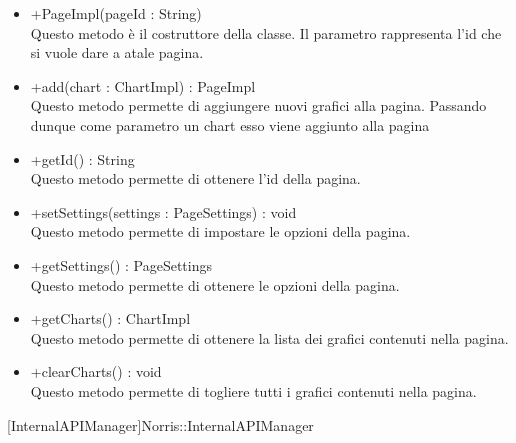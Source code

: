 \begin{itemize}
\begin{itemize}
					\item[\ding{111}] {{+PageImpl(pageId : String)}} \\ [1mm] Questo metodo è il costruttore della classe. Il parametro rappresenta l'id che si vuole dare a atale pagina.
					\item[\ding{111}] {{+add(chart : ChartImpl) : PageImpl}} \\ [1mm] Questo metodo permette di aggiungere nuovi grafici alla pagina. Passando dunque come parametro un chart esso viene aggiunto alla pagina
					\item[\ding{111}] {{+getId() : String}} \\ [1mm] Questo metodo permette di ottenere l'id della pagina.
					\item[\ding{111}] {{+setSettings(settings : PageSettings) : void}} \\ [1mm] Questo metodo permette di impostare le opzioni della pagina.
					\item[\ding{111}] {{+getSettings() : PageSettings}} \\ [1mm] Questo metodo permette di ottenere le opzioni della pagina.
					\item[\ding{111}] {{+getCharts() : ChartImpl}} \\ [1mm] Questo metodo permette di ottenere la lista dei grafici contenuti nella pagina.
					\item[\ding{111}] {{+clearCharts() : void}} \\ [1mm] Questo metodo permette di togliere tutti i grafici contenuti nella pagina.
				\end{itemize}
		
			\end{itemize}

			
			[InternalAPIManager]{Norris::InternalAPIManager}
			

	

